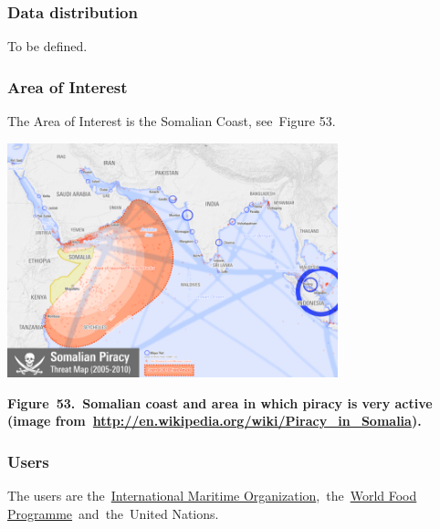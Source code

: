 \documentclass[a4paper]{article}
\begin{document}
\subsubsection[Data distribution]{ Data
distribution}
\hypertarget{Toc381777307}{}{
To be defined.}

\subsubsection[Area of Interest\ ]{ Area of
Interest\ }
\hypertarget{Toc381777308}{}\foreignlanguage{english}{The Area of
Interest is the Somalian Coast, see\ }Figure
53\foreignlanguage{english}{.}


\bigskip

{\centering 
\includegraphics[width=3.77586in,height=2.67205in]{out-img60.png} \par}

{\centering\bfseries
\label{bkm:Ref377561545}Figure\ 53.\ Somalian coast and area in which
piracy is very active (image
from\ \url{http://en.wikipedia.org/wiki/Piracy_in_Somalia}).
\par}


\bigskip

\subsubsection[Users]{ Users}
\hypertarget{Toc381777309}{}The users are
the\ \href{http://en.wikipedia.org/wiki/International_Maritime_Organization}{\foreignlanguage{english}{International
Maritime
Organization}}\foreignlanguage{english}{,\ }\foreignlanguage{english}{the\ }\href{http://en.wikipedia.org/wiki/World_Food_Programme}{\foreignlanguage{english}{World
Food
Programme}}\foreignlanguage{english}{\ and\ }\foreignlanguage{english}{the\ }\foreignlanguage{english}{United
Nations}\foreignlanguage{english}{.}
\end{document}
